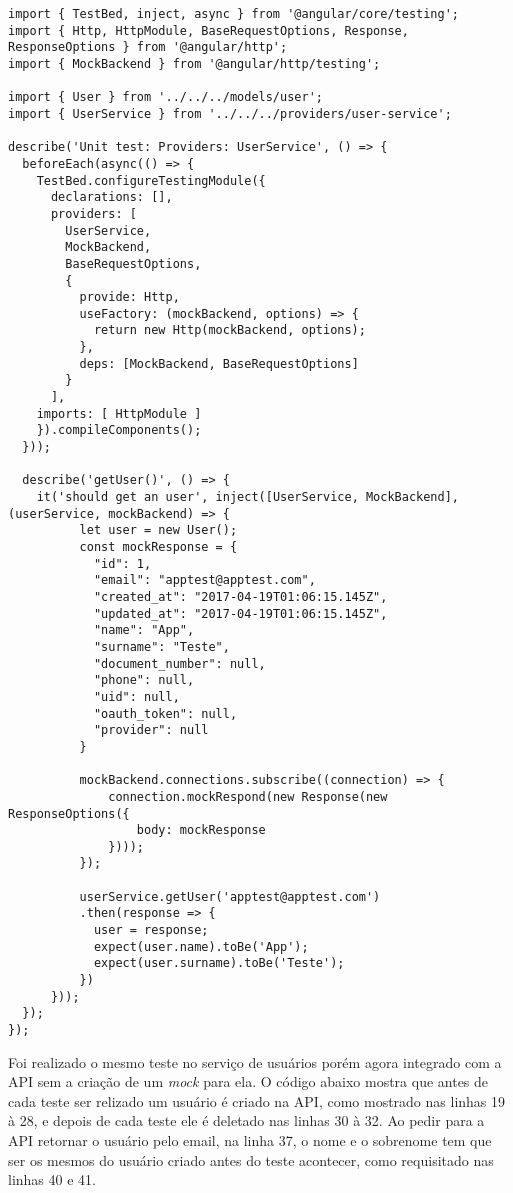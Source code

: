 \medskip
\begin{lstlisting}
import { TestBed, inject, async } from '@angular/core/testing';
import { Http, HttpModule, BaseRequestOptions, Response, ResponseOptions } from '@angular/http';
import { MockBackend } from '@angular/http/testing';

import { User } from '../../../models/user';
import { UserService } from '../../../providers/user-service';

describe('Unit test: Providers: UserService', () => {
  beforeEach(async(() => {
    TestBed.configureTestingModule({
      declarations: [],
      providers: [
        UserService,
        MockBackend,
        BaseRequestOptions,
        {
          provide: Http,
          useFactory: (mockBackend, options) => {
            return new Http(mockBackend, options);
          },
          deps: [MockBackend, BaseRequestOptions]
        }
      ],
    imports: [ HttpModule ]
    }).compileComponents();
  }));

  describe('getUser()', () => {
    it('should get an user', inject([UserService, MockBackend], (userService, mockBackend) => {
          let user = new User();
          const mockResponse = {
            "id": 1,
            "email": "apptest@apptest.com",
            "created_at": "2017-04-19T01:06:15.145Z",
            "updated_at": "2017-04-19T01:06:15.145Z",
            "name": "App",
            "surname": "Teste",
            "document_number": null,
            "phone": null,
            "uid": null,
            "oauth_token": null,
            "provider": null
          }

          mockBackend.connections.subscribe((connection) => {
              connection.mockRespond(new Response(new ResponseOptions({
                  body: mockResponse
              })));
          });

          userService.getUser('apptest@apptest.com')
          .then(response => {
            user = response;
            expect(user.name).toBe('App');
            expect(user.surname).toBe('Teste');
          })
      }));
  });
});
\end{lstlisting}

Foi realizado o mesmo teste no serviço de usuários porém agora integrado com a API sem a criação de um \textit{mock} para ela.
O código abaixo mostra que antes de cada teste ser relizado um usuário é criado na API, como mostrado nas linhas 19 à 28, e depois de cada teste ele é deletado nas linhas 30 à 32.
Ao pedir para a API retornar o usuário pelo email, na linha 37, o nome e o sobrenome tem que ser os mesmos do usuário criado antes do teste acontecer, como requisitado nas linhas 40 e 41.


